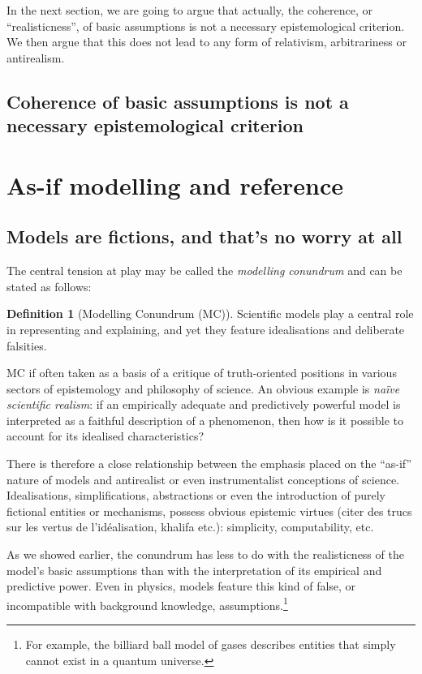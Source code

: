 \documentclass[a4paper,11pt]{article}
\theoremstyle{definition}
\newtheorem{definition}{Definition}
\begin{document}
In the next section, we are going to argue that actually, the coherence, or ``realisticness'', of basic assumptions is not a necessary epistemological criterion. We then argue that this does not lead to any form of relativism, arbitrariness or antirealism. 

\subsection{Coherence of basic assumptions is not a necessary epistemological criterion}

\section{As-if modelling and reference}
\label{sec:asifVerifJust}

\subsection{Models are fictions, and that's no worry at all}

The central tension at play may be called the \textit{modelling conundrum} and can be stated as follows:

\begin{definition}[Modelling Conundrum (MC)]
    Scientific models play a central role in representing and explaining, and yet they feature idealisations and deliberate falsities.
\end{definition}

MC if often taken as a basis of a critique of truth-oriented positions in various sectors of epistemology and philosophy of science. An obvious example is \textit{naïve scientific realism}: if an empirically adequate and predictively powerful model is interpreted as a faithful description of a phenomenon, then how is it possible to account for its idealised characteristics?

There is therefore a close relationship between the emphasis placed on the ``as-if'' nature of models and antirealist or even instrumentalist conceptions of science. Idealisations, simplifications, abstractions or even the introduction of purely fictional entities or mechanisms, possess obvious epistemic virtues (citer des trucs sur les vertus de l'idéalisation, khalifa etc.): simplicity, computability, etc.

As we showed earlier, the conundrum has less to do with the realisticness of the model's basic assumptions than with the interpretation of its empirical and predictive power. Even in physics, models feature this kind of false, or incompatible with background knowledge, assumptions.\footnote{For example, the billiard ball model of gases describes entities that simply cannot exist in a quantum universe.}
\end{document}
